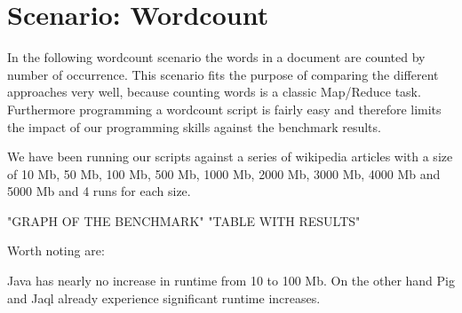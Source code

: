 \section{Scenario: Wordcount}

In the following wordcount scenario the words in a document are counted by number of occurrence. This scenario fits the purpose of comparing the different approaches very well, because counting words is a classic Map/Reduce task. Furthermore programming a wordcount script is fairly easy and therefore limits the impact of our programming skills against the benchmark results.

We have been running our scripts against a series of wikipedia articles with a size of 10 Mb, 50 Mb, 100 Mb, 500 Mb, 1000 Mb, 2000 Mb, 3000 Mb, 4000 Mb and 5000 Mb and 4 runs for each size.

{"GRAPH OF THE BENCHMARK"}
{"TABLE WITH RESULTS"}

Worth noting are:

Java has nearly no increase in runtime from 10 to 100 Mb. On the other hand Pig and Jaql already experience significant runtime increases.